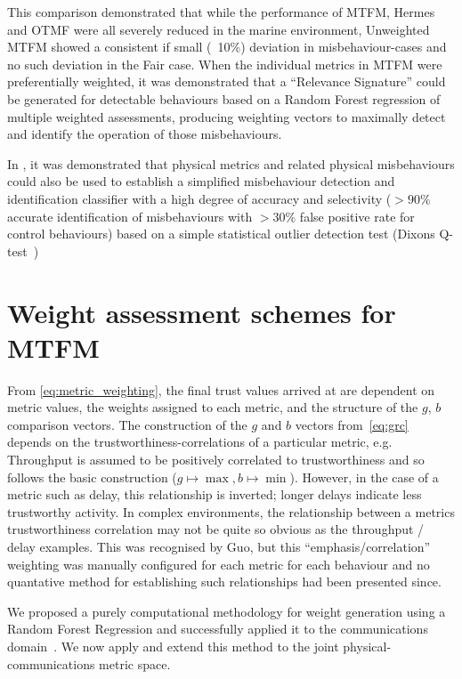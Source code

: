 \documentclass[conference]{IEEEtran}
\begin{document}
This comparison demonstrated that while the performance of MTFM, Hermes and OTMF were all severely reduced in the marine environment, Unweighted MTFM showed a consistent if small (~10\%) deviation in misbehaviour-cases and no such deviation in the Fair case.
When the individual metrics in MTFM were preferentially weighted, it was demonstrated that a ``Relevance Signature'' could be generated for detectable behaviours based on a Random Forest regression of multiple weighted assessments, producing weighting vectors to maximally detect and identify the operation of those misbehaviours.

In \cite{Bolster2016}, it was demonstrated that physical metrics and related physical misbehaviours could also be used to establish a simplified misbehaviour detection and identification classifier with a high degree of accuracy and selectivity ($>90\%$ accurate identification of misbehaviours with $>30\%$ false positive rate for control behaviours) based on a simple statistical outlier detection test (Dixons Q-test~\cite{Dean1951})

\section{Weight assessment schemes for MTFM}\label{sec:weight_ass}

From \eqref{eq:metric_weighting}, the final trust values arrived at are dependent on metric values, the weights assigned to each metric, and the structure of the $g$, $b$ comparison vectors.
The construction of the $g$ and $b$ vectors from~\ref{eq:grc} depends on the trustworthiness-correlations of a particular metric, e.g. Throughput is assumed to be positively correlated to trustworthiness and so follows the basic construction ($g \mapsto \max, b \mapsto \min$).
However, in the case of a metric such as delay, this relationship is inverted; longer delays indicate less trustworthy activity.
In complex environments, the relationship between a metrics trustworthiness correlation may not be quite so obvious as the throughput / delay examples.
This was recognised by Guo, but this ``emphasis/correlation'' weighting was manually configured for each metric for each behaviour and no quantative method for establishing such relationships had been presented since.

We proposed a purely computational methodology for weight generation using a Random Forest Regression and successfully applied it to the communications domain~\cite{Bolster2015}.
We now apply and extend this method to the joint physical-communications metric space.
\end{document}
